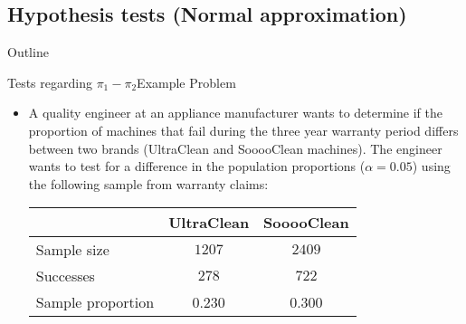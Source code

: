 \documentclass[xcolor=dvipsnames]{beamer}
\begin{document}
\subsection{Hypothesis tests (Normal approximation)}

\begin{frame}{Outline}
	\tableofcontents[currentsection,subsectionstyle=show/shaded/hide]
\end{frame}

\begin{frame}{Tests regarding $\pi_1 - \pi_2$}{Example Problem}
	\begin{itemize}
		\item A quality engineer at an appliance manufacturer wants to determine if the proportion of machines that fail during the three year warranty period differs between two brands (UltraClean and SooooClean machines). The engineer wants to test for a difference in the population proportions ($\alpha = 0.05$) using the following sample from warranty claims:
		\vspace{3mm}
		\begin{center}
			\begin{tabular}{lcc}
				\hline
				& UltraClean & SooooClean \\ \hline
				Sample size & $1207$ & $2409$ \\
				Successes & $278$ & $722$ \\
				Sample proportion & 0.230 & 0.300 \\ \hline
			\end{tabular}
		\end{center}
	\end{itemize}
\end{frame}
\end{document}
